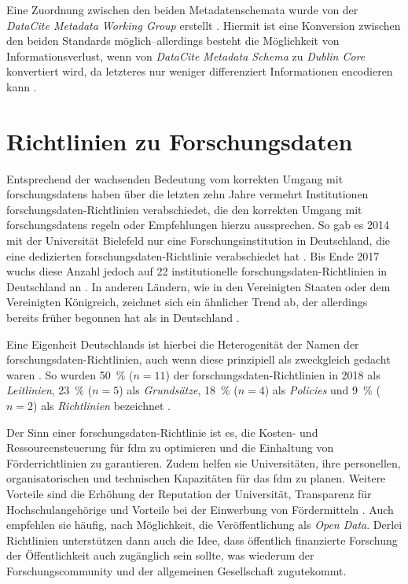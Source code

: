 Eine Zuordnung zwischen den beiden Metadatenschemata wurde von der \textit{DataCite Metadata Working Group} erstellt \autocite{datacite-mapping}.
Hiermit ist eine Konversion zwischen den beiden Standards möglich--allerdings besteht die Möglichkeit von Informationsverlust, wenn von \textit{DataCite Metadata Schema} zu \textit{Dublin Core} konvertiert wird, da letzteres nur weniger differenziert Informationen encodieren kann \autocite{datacite-mapping}.

\section{Richtlinien zu Forschungsdaten}\label{sec:forschungsstand-guidelines}
Entsprechend der wachsenden Bedeutung vom korrekten Umgang mit \glspl{forschungsdaten} haben über die letzten zehn Jahre vermehrt Institutionen \gls{forschungsdaten}-Richtlinien verabschiedet, die den korrekten Umgang mit \glspl{forschungsdaten} regeln oder Empfehlungen hierzu aussprechen.
So gab es 2014 mit der Universität Bielefeld nur eine Forschungsinstitution in Deutschland, die eine dedizierten \gls{forschungsdaten}-Richtlinie verabschiedet hat \autocite[6]{hrk-fdm}. 
Bis Ende 2017 wuchs diese Anzahl jedoch auf \num{22} institutionelle \gls{forschungsdaten}-Richtlinien in Deutschland an \autocite{Hiemenz2018-fdm-report}.
In anderen Ländern, wie in den Vereinigten Staaten oder dem Vereinigten Königreich, zeichnet sich ein ähnlicher Trend ab, der allerdings bereits früher begonnen hat als in Deutschland \autocite{hrk-fdm,Briney2015-Policy}.

Eine Eigenheit Deutschlands ist hierbei die Heterogenität der Namen der \gls{forschungsdaten}-Richtlinien, auch wenn diese prinzipiell als zweckgleich gedacht waren \autocite{Hiemenz2018-fdm-title,Hiemenz2018-fdm-title}.
So wurden \SI{50}{\percent} ($n=11$) der \gls{forschungsdaten}-Richtlinien in 2018 als \textit{Leitlinien}, \SI{23}{\percent} ($n=5$) als \textit{Grundsätze}, \SI{18}{\percent} ($n=4$) als \textit{Policies} und \SI{9}{\percent} ($n=2$) als \textit{Richtlinien} bezeichnet \autocite{Hiemenz2018-fdm-title}.

Der Sinn einer \gls{forschungsdaten}-Richtlinie ist es, die Kosten- und Ressourcensteuerung für \gls{fdm} zu optimieren und die Einhaltung von Förderrichtlinien zu garantieren.
Zudem helfen sie Universitäten, ihre personellen, organisatorischen und technischen Kapazitäten für das \gls{fdm} zu planen.
Weitere Vorteile sind die Erhöhung der Reputation der Universität, Transparenz für Hochschulangehörige und Vorteile bei der Einwerbung von Fördermitteln \autocite{Hiemenz2018-fdm-title,Hiemenz2018-fdm-report}.
Auch empfehlen sie häufig, nach Möglichkeit, die Veröffentlichung als \textit{Open Data}.
Derlei Richtlinien unterstützen dann auch die Idee, dass öffentlich finanzierte Forschung der Öffentlichkeit auch zugänglich sein sollte, was wiederum der Forschungscommunity und der allgemeinen Gesellschaft zugutekommt.

